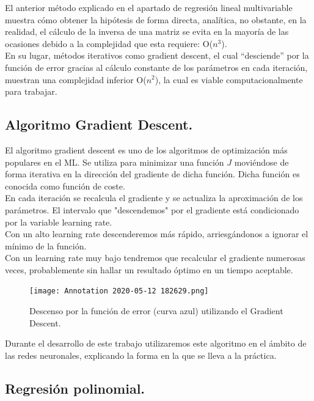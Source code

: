 \documentclass[a4paper,11pt]{article}
\begin{document}
El anterior método explicado en el apartado de regresión lineal multivariable muestra cómo obtener la hipótesis de forma directa, analítica, no obstante, en la realidad, el cálculo de la inversa de una matriz se evita en la mayoría de las ocasiones debido a la complejidad que esta requiere: O($n^3$).\\

\noindent
En su lugar, métodos iterativos como gradient descent, el cual “desciende” por la función de error gracias al cálculo constante de los parámetros en cada iteración, muestran una complejidad inferior O($n^2$), la cual es viable computacionalmente para trabajar. 

\subsection{Algoritmo Gradient Descent.}
El algoritmo gradient descent es uno de los algoritmos de optimización más populares en el ML. Se utiliza para minimizar una función $J$  moviéndose de forma iterativa en la dirección del gradiente de dicha función. Dicha función es conocida como función de coste. \\

\noindent
En cada iteración se recalcula el gradiente y se actualiza la aproximación de
los parámetros.
El intervalo que "descendemos" \hspace{0.16cm}por el gradiente está condicionado por la variable learning rate. \\

\noindent
Con un alto learning rate descenderemos más rápido, arriesgándonos a ignorar el mínimo de la función.\\ 

\noindent
Con un learning rate muy bajo tendremos que recalcular el gradiente numerosas veces, probablemente sin hallar un resultado óptimo en un tiempo aceptable.
\begin{figure}[H]
\centering
\texttt{[image: Annotation 2020-05-12 182629.png]}
\caption{Descenso por la función de error (curva azul) utilizando el Gradient Descent.}
\end{figure}
\noindent
Durante el desarrollo de este trabajo utilizaremos este algoritmo en el ámbito de las redes neuronales, explicando la forma en la que se lleva a la práctica.

\subsection{Regresión polinomial.}
\end{document}

